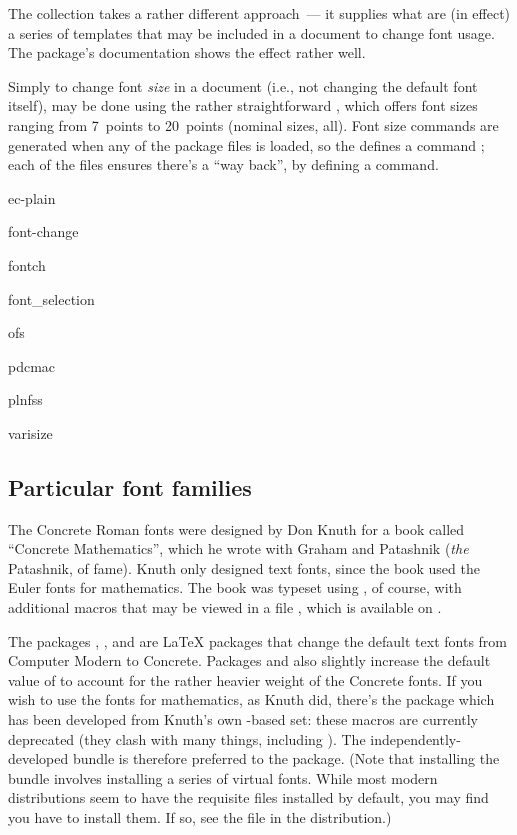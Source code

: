 The  collection takes a rather different
approach~--- it supplies what are (in effect) a series of templates
that may be included in a document to change font usage.  The
package's documentation shows the effect rather well.

Simply to change font \emph{size} in a document (i.e., not changing
the default font itself), may be done using the rather straightforward
, which offers font sizes ranging from 7~points to
20~points (nominal sizes, all).  Font size commands are generated when
any of the package files is loaded, so the  defines a
command ; each of the files ensures there's a ``way
back'', by defining a  command.
\begin{ctanrefs}
\item[ec-plain]
\item[font-change]
\item[fontch]
\item[font_selection]
\item[ofs]
\item[pdcmac]
\item[plnfss]
\item[varisize]
\end{ctanrefs}

\subsection{Particular font families}


The Concrete Roman fonts were designed by Don Knuth for a book called
``Concrete Mathematics'', which he wrote with Graham and Patashnik
(\emph{the} Patashnik, of \BibTeX{} fame).  Knuth
only designed text fonts, since the book used the Euler fonts for
mathematics.  The book was typeset using \plaintex{}, of course, with
additional macros that may be viewed in a file ,
which is available on .

The packages , , and
 are \LaTeX{} packages that change the default text
fonts from Computer Modern to Concrete.  Packages  and
 also slightly increase the default value of
 to account for the rather heavier weight of the
Concrete fonts.  If you wish to use the  fonts for
mathematics, as Knuth did, there's the  package which
has been developed from Knuth's own \plaintex{}-based set: these
macros are currently deprecated (they clash with many things, including
\AMSLaTeX{}).  The independently-developed 
bundle is therefore preferred to the  package.  (Note
that installing the  bundle involves installing a
series of virtual fonts.  While most modern distributions seem to have
the requisite files installed by default, you may find you have to
install them.  If so, see the file  in the
 distribution.)

